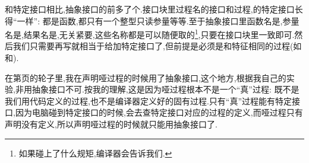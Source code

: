 和特定接口相比,抽象接口的前多了个.接口块里过程名的接口和过程,的特定接口长得``一样'': 都是函数,都只有一个整型只读参量等等.至于抽象接口里函数名是,参量名是,结果名是,无关紧要,这些名称都是可以随便取的\footnote{如果碰上了什么规矩,编译器会告诉我们.},只要在接口块里一致即可.然后我们只需要再写就相当于给加特定接口了,但前提是必须是和特征相同的过程(如和).

在第\pageref{dummy_procedure_program}页的轮子里,我在声明哑过程的时候用了抽象接口,这个地方,根据我自己的实验,非用抽象接口不可.按我的理解,这是因为哑过程根本不是一个``真''过程: 既不是我们用代码定义的过程,也不是编译器定义好的固有过程.只有``真''过程能有特定接口,因为电脑碰到特定接口的时候,会去查特定接口对应的过程的定义,而哑过程只有声明没有定义,所以声明哑过程的时候就只能用抽象接口了.
